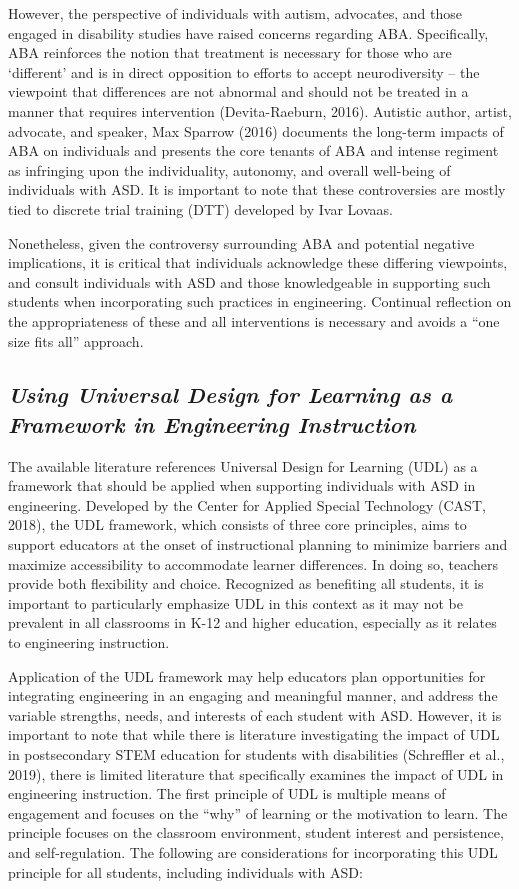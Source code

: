 \documentclass[11.5pt]{sig-alternate}
\begin{document}
\begin{large}
However, the perspective of individuals with autism, advocates, and those engaged in disability studies have raised concerns regarding ABA. Specifically, ABA reinforces the notion that treatment is necessary for those who are ‘different’ and is in direct opposition to efforts to accept neurodiversity – the viewpoint that differences are not abnormal and should not be treated in a manner that requires intervention (Devita-Raeburn, 2016). Autistic author, artist, advocate, and speaker, Max Sparrow (2016) documents the long-term impacts of ABA on individuals and presents the core tenants of ABA and intense regiment as infringing upon the individuality, autonomy, and overall well-being of individuals with ASD. It is important to note that these controversies are mostly tied to discrete trial training (DTT) developed by Ivar Lovaas.

Nonetheless, given the controversy surrounding ABA and potential negative implications, it is critical that individuals acknowledge these differing viewpoints, and consult individuals with ASD and those knowledgeable in supporting such students when incorporating such practices in engineering. Continual reflection on the appropriateness of these and all interventions is necessary and avoids a “one size fits all” approach.

\subsection*{\textbf{\textit{Using Universal Design for Learning as a Framework in Engineering Instruction}}}

The available literature references Universal Design for Learning (UDL) as a framework that should be applied when supporting individuals with ASD in engineering. Developed by the Center for Applied Special Technology (CAST, 2018), the UDL framework, which consists of three core principles, aims to support educators at the onset of instructional planning to minimize barriers and maximize accessibility to accommodate learner differences. In doing so, teachers provide both flexibility and choice. Recognized as benefiting all students, it is important to particularly emphasize UDL in this context as it may not be prevalent in all classrooms in K-12 and higher education, especially as it relates to engineering instruction.

Application of the UDL framework may help educators plan opportunities for integrating engineering in an engaging and meaningful manner, and address the variable strengths, needs, and interests of each student with ASD. However, it is important to note that while there is literature investigating the impact of UDL in postsecondary STEM education for students with disabilities (Schreffler et al., 2019), there is limited literature that specifically examines the impact of UDL in engineering instruction.  
The first principle of UDL is multiple means of engagement and focuses on the “why” of learning or the motivation to learn. The principle focuses on the classroom environment, student interest and persistence, and self-regulation. The following are considerations for incorporating this UDL principle for all students, including individuals with ASD: 


\end{large}
\end{document}
